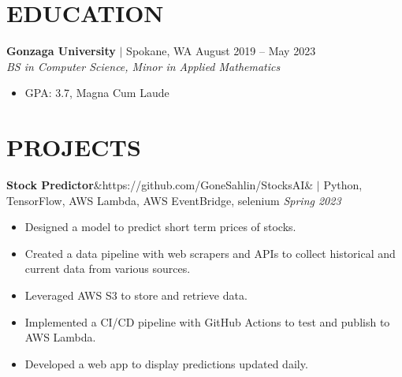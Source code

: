 \documentclass[11pt, a4paper, roman]{moderncv}
\newcommand{\project}[5]{
	\textbf{#1}\ifx&#2&{}
	\else
    		\href{#2}{\:\small\faGithub\:}\fi$|$ #3
	\hfill\textit{#4}
	#5
	\vspace{2mm}
}
\newcommand{\education}[5]{
	\textbf{#1} $|$ #2
	\hfill#3
	\\\textit{#4}
	#5
	\vspace{2mm}
}
\begin{document}
\vspace{4mm}
\linespread{2}
\maketitle
\linespread{1}
\vspace*{-12mm}


\section{EDUCATION}

\education{Gonzaga University}{Spokane, WA}{August 2019 -- May 2023}{BS in Computer Science, Minor in Applied Mathematics}
	{\begin{itemize}
    		\item GPA: 3.7, Magna Cum Laude
  	\end{itemize}
}

\vspace*{-2mm}
\section{PROJECTS}

{\project{Stock Predictor}{https://github.com/GoneSahlin/StocksAI}{Python, TensorFlow, AWS Lambda, AWS EventBridge, selenium}{Spring 2023}
	{\begin{itemize}
		\item Designed a model to predict short term prices of stocks.
		\item Created a data pipeline with web scrapers and APIs to collect historical and current data from various sources.
		\item Leveraged AWS S3 to store and retrieve data.
		\item Implemented a CI/CD pipeline with GitHub Actions to test and publish to AWS Lambda.
		\item Developed a web app to display predictions updated daily.
	\end{itemize}}
}
\end{document}
